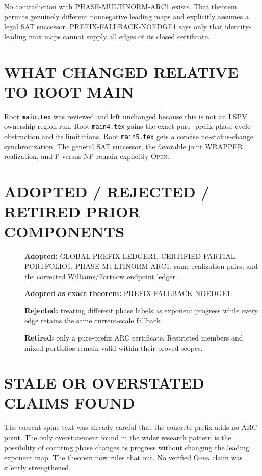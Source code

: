 \documentclass[11pt]{article}
\begin{document}
No contradiction with PHASE-MULTINORM-ARC1 exists.  That theorem permits
genuinely different nonnegative leading maps and explicitly assumes a legal
SAT successor.  PREFIX-FALLBACK-NOEDGE1 says only that identity-leading max
maps cannot supply all edges of its closed certificate.

\section{WHAT CHANGED RELATIVE TO ROOT MAIN}
Root \texttt{main.tex} was reviewed and left unchanged because this is not an
LSPV ownership-region run.  Root \texttt{main4.tex} gains the exact pure-
prefix phase-cycle obstruction and its limitations.  Root \texttt{main5.tex}
gets a concise no-status-change synchronization.  The general SAT successor,
the favorable joint WRAPPER realization, and P versus NP remain explicitly
\textsc{Open}.

\section{ADOPTED / REJECTED / RETIRED PRIOR COMPONENTS}
\begin{description}
\item[] \textbf{Adopted:} GLOBAL-PREFIX-LEDGER1,
CERTIFIED-PARTIAL-PORTFOLIO1, PHASE-MULTINORM-ARC1, same-realization pairs,
and the corrected Williams/Fortnow endpoint ledger.
\item[] \textbf{Adopted as exact theorem:} PREFIX-FALLBACK-NOEDGE1.
\item[] \textbf{Rejected:} treating different phase labels as exponent
progress while every edge retains the same current-scale fallback.
\item[] \textbf{Retired:} only a pure-prefix ARC certificate.  Restricted
members and mixed portfolios remain valid within their proved scopes.
\end{description}

\section{STALE OR OVERSTATED CLAIMS FOUND}
The current spine text was already careful that the concrete prefix adds no
ARC point.  The only overstatement found in the wider research pattern is the
possibility of counting phase changes as progress without changing the
leading exponent map.  The theorem now rules that out.  No verified
\textsc{Open} claim was silently strengthened.
\end{document}
